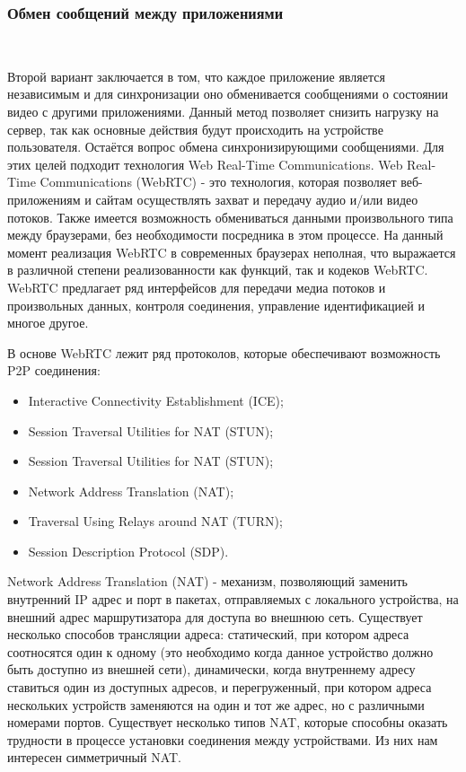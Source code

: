 \subsubsection{Обмен сообщений между приложениями}~\par 
Второй вариант заключается в том, что каждое приложение является независимым и для синхронизации оно обменивается сообщениями о состоянии видео с другими приложениями. 
Данный метод позволяет снизить нагрузку на сервер, так как основные действия будут происходить на устройстве пользователя.
Остаётся вопрос обмена синхронизирующими сообщениями.
Для этих целей подходит технология Web Real-Time Communications. Web Real-Time Communications (WebRTC) - это технология, которая позволяет веб-приложениям и сайтам осуществлять захват и передачу аудио и/или видео потоков. Также имеется возможность обмениваться данными произвольного типа между браузерами, без необходимости посредника в этом процессе. На данный момент реализация WebRTC в современных браузерах неполная, что выражается в различной степени реализованности как функций, так и кодеков WebRTC. WebRTC предлагает ряд интерфейсов для передачи медиа потоков и произвольных данных, контроля соединения, управление идентификацией и многое другое.
 
В основе WebRTC лежит ряд протоколов, которые обеспечивают возможность P2P соединения:
\begin{itemize}
 \item Interactive Connectivity Establishment (ICE);
 \item Session Traversal Utilities for NAT (STUN);
 \item Session Traversal Utilities for NAT (STUN);
 \item Network Address Translation (NAT);
 \item Traversal Using Relays around NAT (TURN);
 \item Session Description Protocol (SDP).
\end{itemize}
 
Network Address Translation (NAT) - механизм, позволяющий заменить внутренний IP адрес и порт в пакетах, отправляемых с локального устройства, на внешний адрес маршрутизатора для доступа во внешнюю сеть. Существует несколько способов трансляции адреса: статический, при котором адреса соотносятся один к одному (это необходимо когда данное устройство должно быть доступно из внешней сети), динамически, когда внутреннему адресу ставиться один из доступных адресов, и перегруженный, при котором адреса нескольких устройств заменяются на один и тот же адрес, но с различными номерами портов. Существует несколько типов NAT, которые способны оказать трудности в процессе установки соединения между устройствами. Из них нам интересен симметричный NAT.
 
